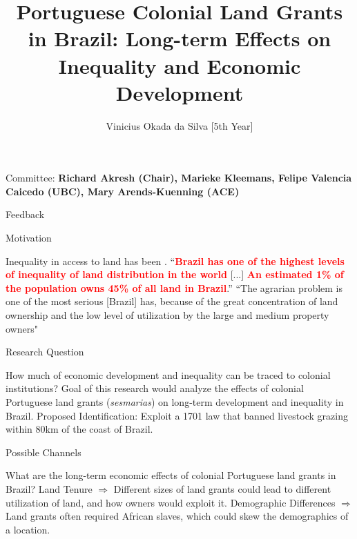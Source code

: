 \documentclass[aspectratio=1610]{beamer}
\title{Portuguese Colonial Land Grants in Brazil: Long-term Effects on Inequality and Economic Development}
\author{Vinicius Okada da Silva [5th Year]}
\date{}
\begin{document}
\begin{frame}
	\titlepage
    \begin{center}
        Committee: \textbf{Richard Akresh (Chair), Marieke Kleemans, Felipe Valencia Caicedo (UBC), Mary Arends-Kuenning (ACE)}
    \end{center}
\end{frame}

\begin{frame}{Feedback}
    
\end{frame}

\begin{frame}{Motivation}
    \begin{outline}
        \1 Inequality in access to land has been .
            \vspace{2mm}
            \2 ``\textcolor{red}{\textbf{Brazil has one of the highest levels of inequality of land distribution in the world}} [...] \textcolor{red}{\textbf{An estimated 1\% of the population owns 45\% of all land in Brazil}}.'' \parencite{Usaid2016-xs}
        \1 ``The agrarian problem is one of the most serious [Brazil] has, because of the great concentration of land ownership and the low level of utilization by the large and medium property owners" \parencite[p.~1]{De_Oliveira_Andrade1980-xz}
    \end{outline}
\end{frame}

\begin{frame}{Research Question}
    \begin{outline}
        \1 How much of economic development and inequality can be traced to colonial institutions?
            \vspace{2mm}
            \2 Goal of this research would analyze the effects of colonial Portuguese land grants (\textit{sesmarias}) on long-term development and inequality in Brazil.
            \vspace{2mm}
        \pause 
        \1 Proposed Identification:
            \2 Exploit a 1701 law that banned livestock grazing within 80km of the coast of Brazil.
    \end{outline}
\end{frame}

\begin{frame}{Possible Channels}
    \begin{outline}
        \1 What are the long-term economic effects of colonial Portuguese land grants in Brazil?
        \vspace{2mm}
        \pause 
            \2 Land Tenure $\Rightarrow$ Different sizes of land grants could lead to different utilization of land, and how owners would exploit it.
            \pause 
            \vspace{2mm}
            \2 Demographic Differences $\Rightarrow$ Land grants often required African slaves, which could skew the demographics of a location.
            \pause 
    \end{outline}
\end{frame}
\end{document}
